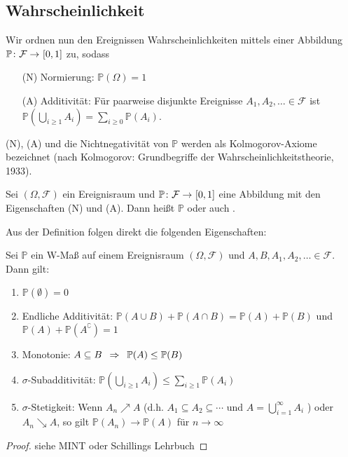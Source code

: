 \subsection*{Wahrscheinlichkeit}
Wir ordnen nun den Ereignissen Wahrscheinlichkeiten mittels einer Abbildung $\abb{\mathbb{P}}{\mathcal{F}}{[0,1]}$
zu, sodass
\begin{enumerate}
    \item[(N)] Normierung: $\mathbb{P}(\Omega) = 1$
    \item[(A)] Additivität: Für paarweise disjunkte Ereignisse $A_1, A_2, \dots \in \mathcal{F}$ ist $\mathbb{P}\left(\bigcup_{i \geq 1} A_i\right) = \sum_{i \geq 0} \mathbb{P}(A_i)$.
\end{enumerate}

(N), (A) und die Nichtnegativität von $\mathbb{P}$ werden als Kolmogorov-Axiome bezeichnet (nach Kolmogorov: Grundbegriffe der Wahrscheinlichkeitstheorie, 1933).

\begin{definition}[Wahrscheinlichkeit]
    Sei $(\Omega, \mathcal{F})$ ein Ereignisraum und $\abb{\mathbb{P}}{\mathcal{F}}{[0,1]}$ eine Abbildung mit den Eigenschaften (N) und (A). Dann heißt $\mathbb{P}$  oder auch .
\end{definition}

Aus der Definition folgen direkt die folgenden Eigenschaften:

\begin{satz} \label{satz: 1.4_rechenregeln}
    Sei $\mathbb{P}$ ein W-Maß auf einem Ereignisraum $(\Omega, \mathcal{F})$ und $A,B,A_1,A_2,\dots \in \mathcal{F}$. Dann gilt:
    \begin{enumerate}[leftmargin=*]
        \item $\mathbb{P}(\emptyset) = 0$
        \item Endliche Additivität: $\mathbb{P} (A \cup B) + \mathbb{P} (A \cap B) = \mathbb{P}(A) + \mathbb{P}(B)$ und $\mathbb{P}(A) + \mathbb{P}(A^\complement) = 1$
        \item Monotonie: $A \subseteq B \enskip \Rightarrow \enskip \mathbb{P}(A) \leq \mathbb{P}(B)$
        \item $\sigma$-Subadditivität: $\mathbb{P}\left(\bigcup_{i \geq 1} A_i \right)  \leq \sum_{i \geq 1} \mathbb{P}(A_i)$
        \item $\sigma$-Stetigkeit: Wenn $A_n \nearrow A$ (d.h. $A_1 \subseteq A_2 \subseteq \cdots$ und $A = \bigcup_{i=1}^{\infty}A_i$ ) oder $A_n \searrow A$, so gilt $\mathbb{P}(A_n) \to \mathbb{P}(A)$ für $n \to \infty$
    \end{enumerate}
\end{satz}
\begin{proof}
    siehe MINT oder Schillings Lehrbuch
\end{proof}

